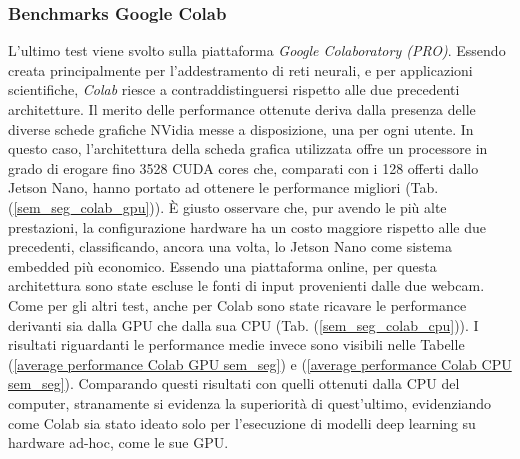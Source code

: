 \subsubsection{Benchmarks Google Colab}
L'ultimo test viene svolto sulla piattaforma \emph{Google Colaboratory (PRO)}. 
Essendo creata principalmente per l'addestramento di reti neurali, e per 
applicazioni scientifiche, \emph{Colab} riesce a contraddistinguersi rispetto alle 
due precedenti architetture. Il merito delle performance ottenute deriva 
dalla presenza delle diverse schede grafiche NVidia messe a disposizione, 
una per ogni utente. In questo caso, l'architettura della scheda grafica 
utilizzata offre un processore in grado di erogare fino 3528 CUDA cores che, 
comparati con i 128 offerti dallo Jetson Nano, hanno portato ad ottenere 
le performance migliori (Tab. (\ref{sem_seg_colab_gpu})). È giusto osservare che, pur avendo 
le più alte prestazioni, la configurazione hardware ha un costo maggiore 
rispetto alle due precedenti, classificando, ancora una volta, lo Jetson Nano 
come sistema embedded più economico. Essendo una piattaforma online, 
per questa architettura sono state escluse le fonti di input provenienti 
dalle due webcam. Come per gli altri test, anche per Colab sono state 
ricavare le performance derivanti sia dalla GPU che dalla sua CPU (Tab. 
(\ref{sem_seg_colab_cpu})). I risultati riguardanti le performance medie invece sono visibili nelle 
Tabelle (\ref{average performance Colab GPU sem_seg}) e (\ref{average performance Colab CPU sem_seg}). Comparando questi risultati con quelli ottenuti dalla 
CPU del computer, stranamente si evidenza la superiorità di quest'ultimo, 
evidenziando come Colab sia stato ideato solo per l'esecuzione di modelli 
deep learning su hardware ad-hoc, come le sue GPU.

